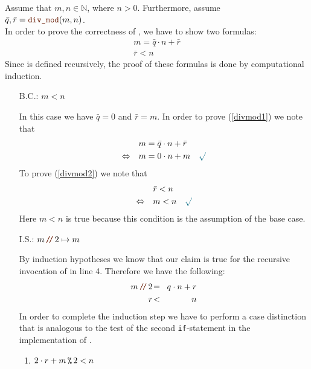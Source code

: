 \proof
Assume that $m,n \in \mathbb{N}$, where $n > 0$.  Furthermore, assume
\\[0.2cm]
\hspace*{1.3cm}
$\bar{q}, \bar{r} = \mytt{div\_mod}(m, n)$.
\\[0.2cm] 
In order to prove the correctness of , we have to show two formulas:
\begin{align}
m = \bar{q} \cdot n + \bar{r} \label{divmod1} \\
\bar{r} < n \label{divmod2}
\end{align}
Since  is defined recursively, the proof of these formulas is done by computational induction.
\begin{enumerate}
\item[B.C.:] $m < n$

  In this case we have $\bar{q} = 0$ and $\bar{r} = m$.
  In order to prove (\ref{divmod1}) we note that 
  \begin{align*}
                    & m = \bar{q} \cdot n + \bar{r} \\
    \Leftrightarrow\quad & m = 0 \cdot n + m \quad \green{\surd}
  \end{align*}
  To prove (\ref{divmod2}) we note that
  \begin{align*}
                         & \bar{r} < n \\
    \Leftrightarrow\quad & m < n \quad\green{\surd}
  \end{align*}
  Here $m < n$ is true because this condition is the assumption of the base case.
\item[I.S.:] $m \dv 2 \mapsto m$

  By induction hypotheses we know that our claim is true for the recursive invocation of  in
  line 4.  Therefore we have the following:
  \begin{eqnarray}
    m \dv 2 &\!=\! & q \cdot n + r \label{divmod3} \\
          r &\!<\! & n             \label{divmod4}
  \end{eqnarray}
  In order to complete the induction step we have to perform a case distinction that is analogous to the test
  of the second \texttt{if}-statement in the implementation of .
  \begin{enumerate}
  \item $2 \cdot r + m \,\texttt{\%}\, 2 < n$


\end{enumerate}
\end{enumerate}
